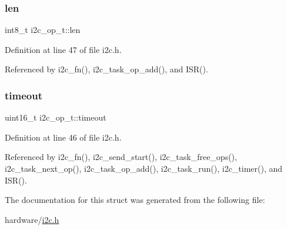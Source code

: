 \mbox{\label{structi2c__op__t_ac7d21b50f84a0d18d28ad36987c9e56a}} 
\subsubsection{\texorpdfstring{len}{len}}
{\footnotesize\ttfamily int8\+\_\+t i2c\+\_\+op\+\_\+t\+::len}



Definition at line 47 of file i2c.\+h.



Referenced by i2c\+\_\+fn(), i2c\+\_\+task\+\_\+op\+\_\+add(), and I\+S\+R().

\mbox{\label{structi2c__op__t_a1b20cc2c470b03ecc097a1cd792bbffb}} 
\subsubsection{\texorpdfstring{timeout}{timeout}}
{\footnotesize\ttfamily uint16\+\_\+t i2c\+\_\+op\+\_\+t\+::timeout}



Definition at line 46 of file i2c.\+h.



Referenced by i2c\+\_\+fn(), i2c\+\_\+send\+\_\+start(), i2c\+\_\+task\+\_\+free\+\_\+ops(), i2c\+\_\+task\+\_\+next\+\_\+op(), i2c\+\_\+task\+\_\+op\+\_\+add(), i2c\+\_\+task\+\_\+run(), i2c\+\_\+timer(), and I\+S\+R().



The documentation for this struct was generated from the following file\+:\begin{DoxyCompactItemize}
\item 
hardware/\hyperlink{i2c_8h}{i2c.\+h}\end{DoxyCompactItemize}
